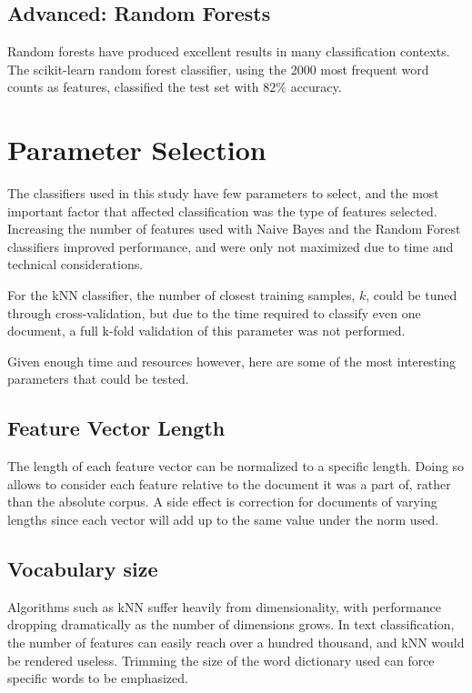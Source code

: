 \documentclass[10pt,twocolumn]{article}
\begin{document}
\subsection*{Advanced: Random Forests}

Random forests have produced excellent results in many classification contexts. The scikit-learn random forest classifier, using the 2000 most frequent word counts as features, classified the test set with $82\%$ accuracy.

\section*{Parameter Selection}

The classifiers used in this study have few parameters to select, and the most important factor that affected classification was the type of features selected.  Increasing the number of features used with Naive Bayes and the Random Forest classifiers improved performance, and were only not maximized due to time and technical considerations.

For the kNN classifier, the number of closest training samples, $k$, could be tuned through cross-validation, but due to the time required to classify even one document, a full k-fold validation of this parameter was not performed.

Given enough time and resources however, here are some of the most interesting parameters that could be tested.

\subsection*{Feature Vector Length}

The length of each feature vector can be normalized to a specific length. Doing so allows to consider each feature relative to the document it was a part of, rather than the absolute corpus. A side effect is correction for documents of varying lengths since each vector will add up to the same value under the norm used.

\subsection*{Vocabulary size}

Algorithms such as kNN suffer heavily from dimensionality, with performance dropping dramatically as the number of dimensions grows. In text classification, the number of features can easily reach over a hundred thousand, and kNN would be rendered useless. Trimming the size of the word dictionary used can force specific words to be emphasized.
\end{document}
